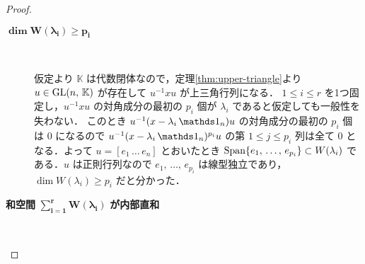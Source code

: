 \documentclass[rep_main]{subfiles}
\begin{document}
\begin{proof}
    \begin{description}
        \item[$\bm{\dim W(\lambda_i) \ge p_i}$]　
        
        仮定より $\mathbb{K}$ は代数閉体なので，定理\ref{thm:upper-triangle}より $u \in \mathrm{GL} (n,\, \mathbb{K})$ が存在して $u^{-1}xu$ が上三角行列になる．
        $1 \le i \le r$ を1つ固定し，$u^{-1} x u$ の対角成分の最初の $p_i$ 個が $\lambda_i$ であると仮定しても一般性を失わない．
        このとき $u^{-1}(x - \lambda_i \, \unity_n) u$ の対角成分の最初の $p_i$ 個は $0$ になるので $u^{-1} (x - \lambda_i \, \unity_n)^{p_i} u$ の第 $1 \le j \le p_i$ 列は全て $0$ となる．よって $u = [e_1\, \dots\, e_n]$ とおいたとき $\operatorname{Span} \{e_1,\, \dots,\, e_{p_i}\} \subset W(\lambda_i)$ である．$u$ は正則行列なので $e_1,\, \dots,\, e_{p_i}$ は線型独立であり，$\dim W(\lambda_i) \ge p_i$ だと分かった．

        \item[\textbf{和空間} $\bm{\sum_{i=1}^r W(\lambda_i)}$ \textbf{が内部直和}]　
        

\end{description}
\end{proof}
\end{document}
